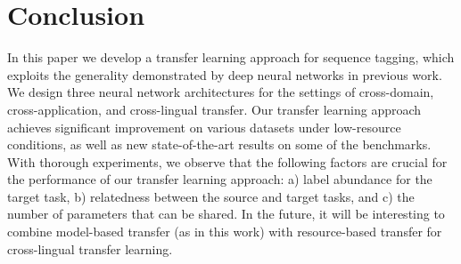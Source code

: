 
\section{Conclusion}
In this paper we develop a transfer learning approach for sequence tagging, which exploits the generality demonstrated by deep neural networks in previous work. We design three neural network architectures
for the settings of cross-domain, cross-application, and cross-lingual transfer. Our transfer learning approach achieves significant improvement on various datasets under low-resource conditions, as well as new state-of-the-art results on some of the benchmarks. With thorough experiments, we observe that the following factors are crucial for the performance of our transfer learning approach: a) label abundance for the target task, b) relatedness between the source and target tasks, and c) the number of parameters that can be shared. In the future, it will be interesting to combine model-based transfer (as in this work) with resource-based transfer for cross-lingual transfer learning.




